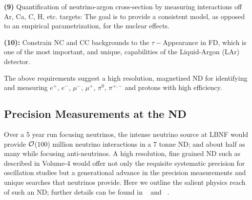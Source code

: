 \vspace{0.25cm} 
\noindent 
{\bf (9)} Quantification of neutrino-argon cross-section 
by measuring interactions off Ar, Ca, C, H, etc. targets: The goal is to provide 
a consistent model, as opposed to an empirical parametrization, for the nuclear effects. 



\vspace{0.25cm} 
\noindent 
{\bf (10):} Constrain NC and CC backgrounds to the {\boldmath $\tau-$}Appearance in FD, 
which is one of the most important, and unique, capabilities of the Liquid-Argon (LAr) detector. 

\noindent
The above requirements suggest a high resolution, magnetized ND for identifying and 
measuring $e^+$, $e^-$, $\mu^-$, $\mu^+$, $\pi^0$, $\pi^{+,-}$ and protons  with high efficiency. 



\subsection{Precision Measurements at the ND} 
\label{sec-nd-sbp} 

\noindent
Over a 5 year run focusing neutrinos,  the intense neutrino source at LBNF would provide 
${\cal {O}}$(100) million neutrino interactions in a 7 tonne ND; 
and about half as many while focusing anti-neutrinos. 
A high resolution, fine grained ND such as described in Volume-4 would offer not only the requisite systematic 
precision for  oscillation studies but a generational advance in the precision measurements and unique 
searches  that neutrinos provide. Here we outline the salient physics reach of such an ND; further details can be 
found in ~\cite{DPR} and ~\cite{LBNE-SCI}. 

